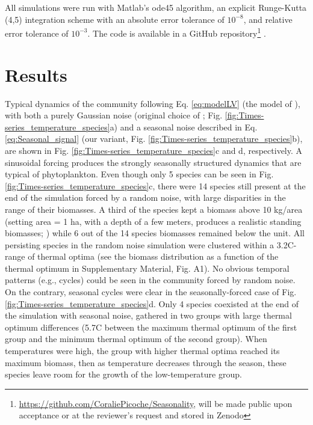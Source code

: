 \documentclass[a4paper,12pt]{article}
\begin{document}
All simulations were run with Matlab's ode45 algorithm, an explicit
Runge-Kutta (4,5) integration scheme with an absolute error tolerance
of $10^{-8}$, and relative error tolerance of $10^{-3}$. The code
is available in a GitHub repository\footnote{\url{https://github.com/CoraliePicoche/Seasonality}, will be made
public upon acceptance or at the reviewer's request and stored in
Zenodo} .
 
\section*{Results}

Typical dynamics of the community following Eq. \ref{eq:modelLV}
(the model of \citealp{scranton_coexistence_2016}), with both a purely
Gaussian noise (original choice of \citealp{scranton_coexistence_2016};
Fig. \ref{fig:Times-series_temperature_species}a) and a seasonal
noise described in Eq. \ref{eq:Seasonal_signal} (our variant, Fig.
\ref{fig:Times-series_temperature_species}b), are shown in Fig. \ref{fig:Times-series_temperature_species}c
and d, respectively. A sinusoidal forcing produces the strongly seasonally
structured dynamics that are typical of phytoplankton. Even though
only 5 species can be seen in Fig. \ref{fig:Times-series_temperature_species}c,
there were 14 species still present at the end of the simulation forced
by a random noise, with large disparities in the range of their biomasses.
A third of the species kept a biomass above 10 kg/area (setting area
= 1 ha, with a depth of a few meters, produces a realistic standing
biomasses; \citealp{reynolds2006ecology}) while 6 out of the 14 species
biomasses remained below the unit. All persisting species in the random
noise simulation were clustered within a 3.2\textdegree C-range of thermal optima
(see the biomass distribution as a function of the thermal optimum
in Supplementary Material, Fig. A1). No obvious temporal patterns
(e.g., cycles) could be seen in the community forced by random noise.
On the contrary, seasonal cycles were clear in the seasonally-forced
case of Fig. \ref{fig:Times-series_temperature_species}d. Only 4
species coexisted at the end of the simulation with seasonal noise,
gathered in two groups with large thermal optimum differences (5.7\textdegree C
between the maximum thermal optimum of the first group and the minimum
thermal optimum of the second group). When temperatures were high,
the group with higher thermal optima reached its maximum biomass,
then as temperature decreases through the season, these species leave
room for the growth of the low-temperature group.
\end{document}
